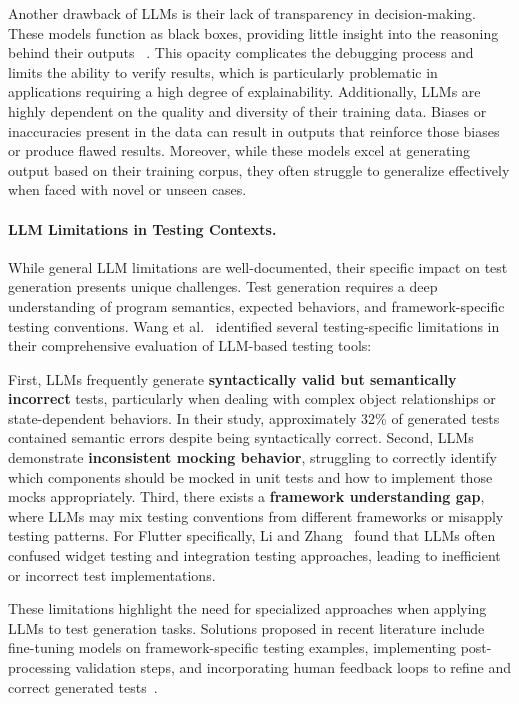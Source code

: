 \hspace{0.5cm} Another drawback of LLMs is their lack of transparency in decision-making. These models function as black boxes, providing little insight into the reasoning behind their outputs ~\cite{LLMLimitations}. This opacity complicates the debugging process and limits the ability to verify results, which is particularly problematic in applications requiring a high degree of explainability. Additionally, LLMs are highly dependent on the quality and diversity of their training data. Biases or inaccuracies present in the data can result in outputs that reinforce those biases or produce flawed results. Moreover, while these models excel at generating output based on their training corpus, they often struggle to generalize effectively when faced with novel or unseen cases.

\paragraph{LLM Limitations in Testing Contexts.} While general LLM limitations are well-documented, their specific impact on test generation presents unique challenges. Test generation requires a deep understanding of program semantics, expected behaviors, and framework-specific testing conventions. Wang et al.~\cite{LLMTestingLimitations} identified several testing-specific limitations in their comprehensive evaluation of LLM-based testing tools:

\hspace{0.5cm} First, LLMs frequently generate \textbf{syntactically valid but semantically incorrect} tests, particularly when dealing with complex object relationships or state-dependent behaviors. In their study, approximately 32\% of generated tests contained semantic errors despite being syntactically correct. Second, LLMs demonstrate \textbf{inconsistent mocking behavior}, struggling to correctly identify which components should be mocked in unit tests and how to implement those mocks appropriately. Third, there exists a \textbf{framework understanding gap}, where LLMs may mix testing conventions from different frameworks or misapply testing patterns. For Flutter specifically, Li and Zhang~\cite{FlutterTestingChallenges} found that LLMs often confused widget testing and integration testing approaches, leading to inefficient or incorrect test implementations.

\hspace{0.5cm} These limitations highlight the need for specialized approaches when applying LLMs to test generation tasks. Solutions proposed in recent literature include fine-tuning models on framework-specific testing examples, implementing post-processing validation steps, and incorporating human feedback loops to refine and correct generated tests~\cite{LLMTestEnhancements}.

